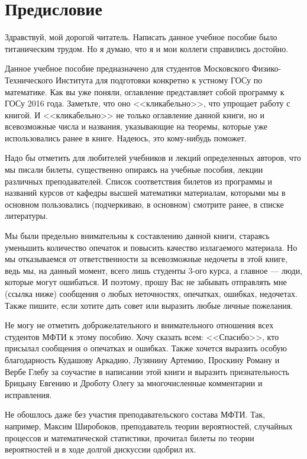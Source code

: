 \chapter{Предисловие}
Здравствуй, мой дорогой читатель. Написать данное учебное пособие было титаническим трудом. Но я думаю, что я и мои коллеги справились достойно.

Данное учебное пособие предназначено для студентов Московского Физико-Технического Института для подготовки конкретно к устному ГОСу по математике. Как вы уже поняли, оглавление представляет собой программу к ГОСу 2016 года. Заметьте, что оно <<кликабельно>>, что упрощает работу с книгой. И <<кликабельно>> не только оглавление данной книги, но и всевозможные числа и названия, указывающие на теоремы, которые уже использовались ранее в книге. Надеюсь, это кому-нибудь поможет. 

Надо бы отметить для любителей учебников и лекций определенных авторов, что мы писали билеты, существенно опираясь на учебные пособия, лекции различных преподавателей. Список соответствия билетов из программы и названий курсов от кафедры высшей математики материалам, которыми мы в основном пользовались (подчеркиваю, в основном) смотрите ранее, в списке литературы.

Мы были предельно внимательны к составлению данной книги, стараясь уменьшить количество опечаток и повысить качество излагаемого материала. Но мы отказываемся от ответственности за всевозможные недочеты в этой книге, ведь мы, на данный момент, всего лишь студенты 3-ого курса, а главное --- люди, которые могут ошибаться. И поэтому, прошу Вас не забывать отправлять мне (ссылка ниже) сообщения о любых неточностях, опечатках, ошибках, недочетах. Также пишите, если хотите дать совет или выразить любые личные пожелания. 

Не могу не отметить доброжелательного и внимательного отношения всех студентов МФТИ к этому пособию. Хочу сказать всем: <<Спасибо>>, кто присылал сообщения о опечатках и ошибках. Также хочется выразить особую благодарность Кудашову Аркадию, Лузянину Артемию, Проскину Роману и Вербе Глебу за соучастие в написании этой книги и выразить признательность Брицыну Евгению и Дроботу Олегу за многочисленные комментарии и исправления.

Не обошлось даже без участия преподавательского состава МФТИ. Так, например, Максим Широбоков, преподаватель теории вероятностей, случайных процессов и математической статистики, прочитал билеты по теории вероятностей и в ходе долгой дискуссии одобрил их.
 
